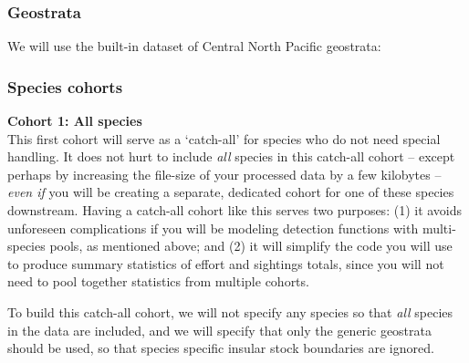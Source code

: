 \documentclass[
]{book}
\newenvironment{Shaded}{\begin{snugshade}}{\end{snugshade}}
\newcommand{\DecValTok}[1]{\textcolor[rgb]{0.00,0.00,0.81}{#1}}
\newcommand{\KeywordTok}[1]{\textcolor[rgb]{0.13,0.29,0.53}{\textbf{#1}}}
\newcommand{\NormalTok}[1]{#1}
\newcommand{\OperatorTok}[1]{\textcolor[rgb]{0.81,0.36,0.00}{\textbf{#1}}}
\newcommand{\StringTok}[1]{\textcolor[rgb]{0.31,0.60,0.02}{#1}}
\begin{document}
\hypertarget{geostrata}{%
\subsubsection*{Geostrata}\label{geostrata}}

We will use the built-in dataset of Central North Pacific geostrata:

\begin{Shaded}
\end{Shaded}

\hypertarget{species-cohorts}{%
\subsubsection*{Species cohorts}\label{species-cohorts}}

\textbf{Cohort 1: All species}\\
This first cohort will serve as a `catch-all' for species who do not need special handling. It does not hurt to include \emph{all} species in this catch-all cohort -- except perhaps by increasing the file-size of your processed data by a few kilobytes -- \emph{even if} you will be creating a separate, dedicated cohort for one of these species downstream. Having a catch-all cohort like this serves two purposes: (1) it avoids unforeseen complications if you will be modeling detection functions with multi-species pools, as mentioned above; and (2) it will simplify the code you will use to produce summary statistics of effort and sightings totals, since you will not need to pool together statistics from multiple cohorts.

To build this catch-all cohort, we will not specify any species so that \emph{all} species in the data are included, and we will specify that only the generic geostrata should be used, so that species specific insular stock boundaries are ignored.
\end{document}
